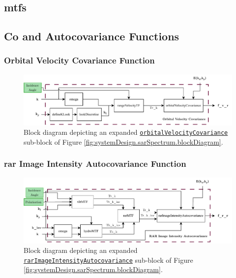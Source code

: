 \subsection{\acfp{mtf}} \label{subsec:systemDesign.sarSpectrum.mtfs}

\subsection{Co and Autocovariance Functions} \label{subsec:systemDesign.sarSpectrum.coAutoFunc}

\subsubsection{Orbital Velocity Covariance Function}

\begin{figure}[H]
    \centering
    \includegraphics[width=.95\linewidth]{Figures/PipelineDesign/orbitalVelocityCovariance.pdf}
    \caption{Block diagram depicting an expanded \href{https://github.com/JNSRYA006/sar-parameter-extraction-pipeline/blob/main/functions/hasselmann/helperFunctions.m}{\lstinline{orbitalVelocityCovariance}} sub-block of Figure \ref{fig:systemDesign.sarSpectrum.blockDiagram}.}
    \label{fig:systemDesign.sarSpectrum.blockDiagram.orbitalVelocity}
\end{figure}

\subsubsection{\acs{rar} Image Intensity Autocovariance Function}

\begin{figure}[H]
    \centering
    \includegraphics[width=.95\linewidth]{Figures/PipelineDesign/RARAutocovariance.pdf}
    \caption{Block diagram depicting an expanded \href{https://github.com/JNSRYA006/sar-parameter-extraction-pipeline/blob/main/functions/hasselmann/helperFunctions.m}{\lstinline{rarImageIntensityAutocovariance}} sub-block of Figure \ref{fig:systemDesign.sarSpectrum.blockDiagram}.}
    \label{fig:systemDesign.sarSpectrum.blockDiagram.rarAutoco}
\end{figure}

